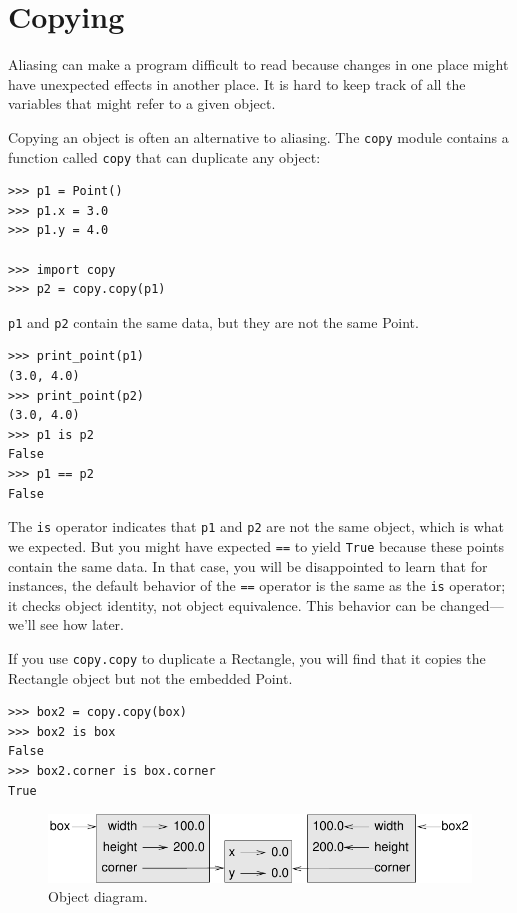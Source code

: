\documentclass[10pt]{book}
\begin{document}
\section{Copying}
\label{copying}

Aliasing can make a program difficult to read because changes
in one place might have unexpected effects in another place.
It is hard to keep track of all the variables that might refer
to a given object.

Copying an object is often an alternative to aliasing.
The {\tt copy} module contains a function called {\tt copy} that
can duplicate any object:

\begin{verbatim}
>>> p1 = Point()
>>> p1.x = 3.0
>>> p1.y = 4.0

>>> import copy
>>> p2 = copy.copy(p1)
\end{verbatim}
%
{\tt p1} and {\tt p2} contain the same data, but they are
not the same Point.

\begin{verbatim}
>>> print_point(p1)
(3.0, 4.0)
>>> print_point(p2)
(3.0, 4.0)
>>> p1 is p2
False
>>> p1 == p2
False
\end{verbatim}
%
The {\tt is} operator indicates that {\tt p1} and {\tt p2} are not the
same object, which is what we expected.  But you might have expected
{\tt ==} to yield {\tt True} because these points contain the same
data.  In that case, you will be disappointed to learn that for
instances, the default behavior of the {\tt ==} operator is the same
as the {\tt is} operator; it checks object identity, not object
equivalence.  This behavior can be changed---we'll see how later.

If you use {\tt copy.copy} to duplicate a Rectangle, you will find
that it copies the Rectangle object but not the embedded Point.

\begin{verbatim}
>>> box2 = copy.copy(box)
>>> box2 is box
False
>>> box2.corner is box.corner
True
\end{verbatim}

\begin{figure}
\centerline
{\includegraphics[scale=0.8]{figs/rectangle2.pdf}}
\caption{Object diagram.}
\label{fig.rectangle2}
\end{figure}
\end{document}
